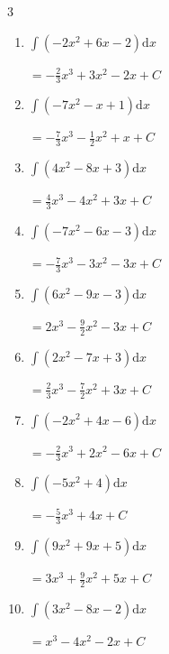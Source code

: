 \begin{multicols}{3}
\begin{enumerate}
        $\displaystyle =-\frac{1}{3}x^{3}+\frac{5}{2}x^{2}-x+ C$

  \item $\displaystyle \int \left( -2x^{2}+6x-2 \right) \mathrm{d}x$

        $\displaystyle =-\frac{2}{3}x^{3}+3x^{2}-2x+ C$

  \item $\displaystyle \int \left( -7x^{2}-x+1 \right) \mathrm{d}x$

        $\displaystyle =-\frac{7}{3}x^{3}-\frac{1}{2}x^{2}+x+ C$

  \item $\displaystyle \int \left( 4x^{2}-8x+3 \right) \mathrm{d}x$

        $\displaystyle =\frac{4}{3}x^{3}-4x^{2}+3x+ C$

\columnbreak %

\resetques

  \item $\displaystyle \int \left( -7x^{2}-6x-3 \right) \mathrm{d}x$

        $\displaystyle =-\frac{7}{3}x^{3}-3x^{2}-3x+ C$

  \item $\displaystyle \int \left( 6x^{2}-9x-3 \right) \mathrm{d}x$

        $\displaystyle =2x^{3}-\frac{9}{2}x^{2}-3x+ C$

  \item $\displaystyle \int \left( 2x^{2}-7x+3 \right) \mathrm{d}x$

        $\displaystyle =\frac{2}{3}x^{3}-\frac{7}{2}x^{2}+3x+ C$

  \item $\displaystyle \int \left( -2x^{2}+4x-6 \right) \mathrm{d}x$

        $\displaystyle =-\frac{2}{3}x^{3}+2x^{2}-6x+ C$

  \item $\displaystyle \int \left( -5x^{2}+4 \right) \mathrm{d}x$

        $\displaystyle =-\frac{5}{3}x^{3}+4x+ C$

  \item $\displaystyle \int \left( 9x^{2}+9x+5 \right) \mathrm{d}x$

        $\displaystyle =3x^{3}+\frac{9}{2}x^{2}+5x+ C$

  \item $\displaystyle \int \left( 3x^{2}-8x-2 \right) \mathrm{d}x$

        $\displaystyle =x^{3}-4x^{2}-2x+ C$


\end{enumerate}
\end{multicols}
